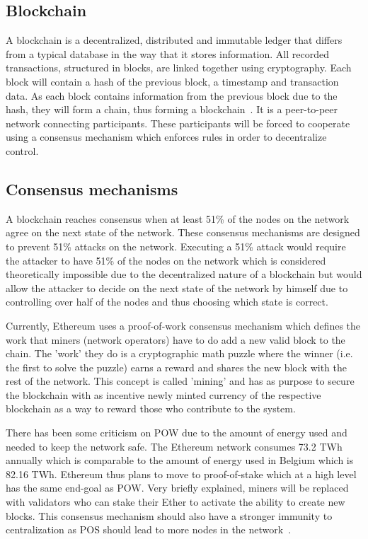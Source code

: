 \documentclass[10pt,conference]{IEEEtran}
\begin{document}
\subsection{Blockchain}
A blockchain is a decentralized, distributed and immutable ledger that differs from a typical database in the way that it stores information. All recorded transactions, structured in blocks, are linked together using cryptography. Each block will contain a hash of the previous block, a timestamp and transaction data. As each block contains information from the previous block due to the hash, they will form a chain, thus forming a blockchain~\cite{article}. It is a peer-to-peer network connecting participants. These participants will be forced to cooperate using a consensus mechanism which enforces rules in order to decentralize control.

\subsection{Consensus mechanisms}

A blockchain reaches consensus when at least 51\% of the nodes on the network agree on the next state of the network. These consensus mechanisms are designed to prevent 51\% attacks on the network. Executing a 51\% attack would require the attacker to have 51\% of the nodes on the network which is considered theoretically impossible due to the decentralized nature of a blockchain but would allow the attacker to decide on the next state of the network by himself due to controlling over half of the nodes and thus choosing which state is correct. 


Currently, Ethereum uses a proof-of-work consensus mechanism which defines the work that miners (network operators) have to do add a new valid block to the chain. The 'work' they do is a cryptographic math puzzle where the winner (i.e. the first to solve the puzzle) earns a reward and shares the new block with the rest of the network. This concept is called 'mining' and has as purpose to secure the blockchain with as incentive newly minted currency of the respective blockchain as a way to reward those who contribute to the system.


There has been some criticism on POW due to the amount of energy used and needed to keep the network safe. The Ethereum network consumes 73.2 TWh annually which is comparable to the amount of energy used in Belgium which is 82.16 TWh. Ethereum thus plans to move to proof-of-stake which at a high level has the same end-goal as POW. Very briefly explained, miners will be replaced with validators who can stake their Ether to activate the ability to create new blocks. This consensus mechanism should also have a stronger immunity to centralization as POS should lead to more nodes in the network~\cite{ethereum,  white_paper}.
\end{document}
